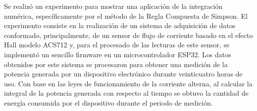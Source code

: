 \label{sec:introduccion}
Se realizó un experimento para mostrar una aplicación de la integración numérica, específicamente por el método de la Regla Compuesta de Simpson.
El experimento consiste en la realización de un sistema de adquisición de datos conformado, principalmente, de un sensor de flujo de corriente basado
en el efecto Hall modelo ACS712 y, para el procesado de las lecturas de este sensor, se implementó un sencillo firmware en un microcontrolador ESP32.
Los datos obtenidos por este sistema se procesaron para obtener una medición de la potencia generada por un dispositivo electrónico durante veinticuatro horas
de uso. Con base en las leyes de funcionamiento de la corriente alterna, al calcular la integral de la potencia generada con respecto al tiempo se obtuvo la cantidad de energía consumida por el dispositivo durante el periodo de medición.

\clearpage
